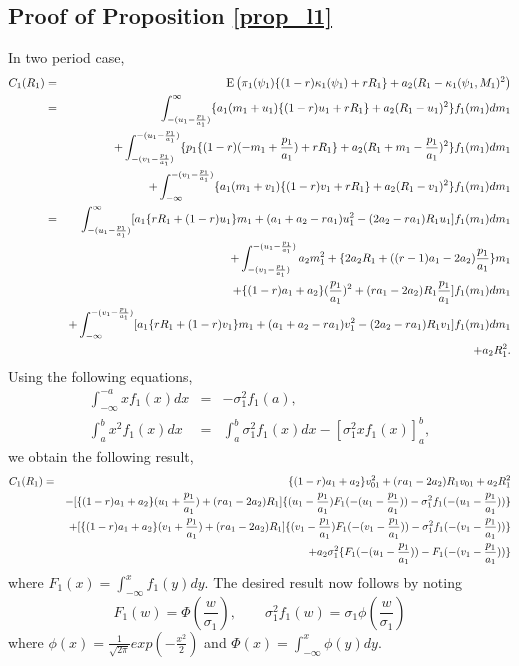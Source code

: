 \subsection{Proof of Proposition \ref{prop_l1}}
In two period case,
\begin{eqnarray*} \label{eq_l42}
  C_1(R_1) & = & \ex{ \pi_1(\psi_1) \{(1-r) \kappa_1(\psi_1) + r R_1 \}+ a_2(R_1-\kappa_1(\psi_1,M_1)^2} \nonumber \\
      & = &  \int_{-(\u1)}^{\infty}\{a_1(m_1+u_1)\{(1-r)u_1+rR_1\}+a_2(R_1-u_1)^2\}f_1(m_1)dm_1 \nonumber \\
      &   &  +\int_{-(\v1)}^{-(\u1)}\{p_1\{(1-r)(-m_1+\frac{p_1}{a_1})+rR_1\}+a_2(R_1+m_1-\frac{p_1}{a_1})^2\}f_1(m_1)dm_1 \nonumber \\
      &   &  +\int_{-\infty}^{-(\v1)}\{a_1(m_1+v_1)\{(1-r)v_1+rR_1\}+a_2(R_1-v_1)^2\}f_1(m_1)dm_1 \nonumber \\
      & = &  \int_{-(\u1)}^{\infty}[a_1\{rR_1+(1-r)u_1\}m_1+(a_1+a_2-ra_1)u_1^2-(2a_2-ra_1)R_1u_1]f_1(m_1)dm_1 \nonumber \\
      &   &  +\int_{-(\v1)}^{-(\u1)} a_2m_1^2+\{2a_2R_1+((r-1)a_1-2a_2)\frac{p_1}{a_1}\}m_1 \nonumber \\
      &   & +\{(1-r)a_1+a_2\}(\frac{p_1}{a_1})^2+(ra_1-2a_2)R_1\frac{p_1}{a_1} ]f_1(m_1)dm_1 \nonumber \\
      &   &  +\int_{-\infty}^{-(\v1)}[a_1\{rR_1+(1-r)v_1\}m_1+(a_1+a_2-ra_1)v_1^2-(2a_2-ra_1)R_1v_1]f_1(m_1)dm_1 \nonumber \\
      &   & +a_2R_1^2.
\end{eqnarray*}
Using the following equations,
\begin{eqnarray*}
  \int_{-\infty}^{-a} x f_1(x) dx & = &  -\sigma_1^2 f_1(a),  \label{eq_l43}\\
  \int_{a}^{b} x^2 f_1(x)dx       & = &  \int_{a}^{b} \sigma_1^2 f_1(x)dx -[\sigma_1^2 x f_1(x)]_a^b,  \label{eq_l44}
\end{eqnarray*}
we obtain the following result,
\begin{eqnarray*} \label{eq_l45}
  C_1(R_1) & = &  \{(1-r)a_1+a_2\}v_{01}^2+(ra_1-2a_2)R_1v_{01}+a_2R_1^2 \nonumber \\
      &   &  - [\{(1-r)a_1+a_2\}(u_1+\frac{p_1}{a_1})+(ra_1-2a_2)R_1]\{(\u1)F_1(-(\u1))-\sigma_1^2f_1(-(\u1))\} \nonumber \\
      &   &  + [\{(1-r)a_1+a_2\}(v_1+\frac{p_1}{a_1})+(ra_1-2a_2)R_1]\{(\v1)F_1(-(\v1))-\sigma_1^2f_1(-(\v1))\} \nonumber \\
      &   &  +a_2\sigma_1^2 \{F_1(-(\u1))-F_1(-(\v1))\}
\end{eqnarray*}
where $F_1(x)= \int_{-\infty}^x f_1(y) dy.$
 The desired result now follows by noting
\[
 F_1(w) = \Phi(\frac{w}{\sigma_1}), \qquad \sigma_1^2 f_1(w) = \sigma_1 \phi(\frac{w}{\sigma_1})
\]
where $\displaystyle \phi(x)=\frac{1}{\sqrt{2\pi}}exp(-\frac{x^2}{2})$
and $\Phi(x)=\int_{-\infty}^x \phi(y) dy$.


